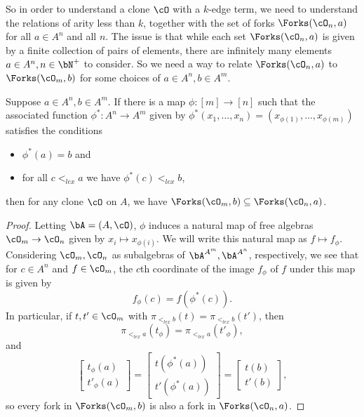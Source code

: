 So in order to understand a clone $\cO$ with a $k$-edge term, we need to understand the relations of arity less than $k$, together with the set of forks $\Forks(\cO_n,a)$ for all $a \in A^n$ and all $n$. The issue is that while each set $\Forks(\cO_n,a)$ is given by a finite collection of pairs of elements, there are infinitely many elements $a \in A^n, n \in \bN^+$ to consider. So we need a way to relate $\Forks(\cO_n,a)$ to $\Forks(\cO_m,b)$ for some choices of $a \in A^n, b \in A^m$.

\begin{prop} Suppose $a \in A^n, b \in A^m$. If there is a map $\phi : [m] \rightarrow [n]$ such that the associated function $\phi^* : A^n \rightarrow A^m$ given by $\phi^*(x_1, ..., x_n) = (x_{\phi(1)}, ..., x_{\phi(m)})$ satisfies the conditions
\begin{itemize}
\item $\phi^*(a) = b$ and
\item for all $c <_{lex} a$ we have $\phi^*(c) <_{lex} b$,
\end{itemize}
then for any clone $\cO$ on $A$, we have $\Forks(\cO_m,b) \subseteq \Forks(\cO_n,a)$.
\end{prop}
\begin{proof} Letting $\bA = (A,\cO)$, $\phi$ induces a natural map of free algebras $\cO_m \rightarrow \cO_n$ given by $x_i \mapsto x_{\phi(i)}$. We will write this natural map as $f \mapsto f_\phi$. Considering $\cO_m, \cO_n$ as subalgebras of $\bA^{A^m}, \bA^{A^n}$, respectively, we see that for $c \in A^n$ and $f \in \cO_m$, the $c$th coordinate of the image $f_\phi$ of $f$ under this map is given by
\[
f_\phi(c) = f(\phi^*(c)).
\]
In particular, if $t, t' \in \cO_m$ with $\pi_{<_{lex} b}(t) = \pi_{<_{lex} b}(t')$, then
\[
\pi_{<_{lex} a}(t_\phi) = \pi_{<_{lex} a}(t'_\phi),
\]
and
\[
\begin{bmatrix} t_\phi(a)\\ t'_\phi(a)\end{bmatrix} = \begin{bmatrix} t(\phi^*(a))\\ t'(\phi^*(a))\end{bmatrix} = \begin{bmatrix} t(b)\\ t'(b)\end{bmatrix},
\]
so every fork in $\Forks(\cO_m,b)$ is also a fork in $\Forks(\cO_n,a)$.
\end{proof}


